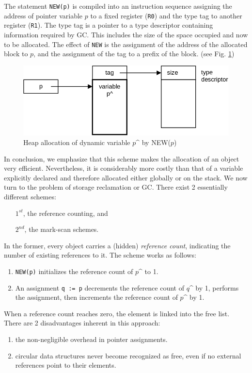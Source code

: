 The statement \verb|NEW(p)| is compiled into an instruction sequence assigning the address
of pointer variable $p$ to a fixed register (\verb|R0|) and the type tag to another register
(\verb|R1|). The type tag is a pointer to a type descriptor containing information required
by GC. This includes the size of the space occupied and now to be allocated. The effect of
\verb|NEW| is the assignment of the address of the allocated block to $p$, and the assignment
of the tag to a prefix of the block. (see Fig. \ref{fig:allocation})
\begin{figure}[h!]
  \label{fig:allocation}
  \centering
  \includegraphics[width=\textwidth]{i/r}
  \caption{Heap allocation of dynamic variable $p$\^{} by NEW($p$)}
\end{figure}

In conclusion, we emphasize that this scheme makes the allocation of an object very efficient.
Nevertheless, it is considerably more costly than that of a variable explicitly declared
and therefore allocated either globally or on the stack. We now turn to the problem of
storage reclamation or GC. There exist 2 essentially different schemes:
\begin{itemize}
  \item[$1^{st}$,] the reference counting, and
  \item[$2^{nd}$,] the mark-scan schemes.
\end{itemize}
In the former, every object carries a (hidden) \emph{reference count}, indicating the number
of existing references to it. The scheme works as follows:
\begin{enumerate}
  \item \verb|NEW(p)| initializes the reference count of $p$\^{} to 1.
  \item An assignment \verb|q := p| decrements the reference count of $q$\^{} by 1, performs
    the assignment, then increments the reference count of $p$\^{} by 1.
\end{enumerate}
When a reference count reaches zero, the element is linked into the free list. There are 2
disadvantages inherent in this approach:
\begin{enumerate}
  \item the non-negligible overhead in pointer assignments.
  \item circular data structures never become recognized as free,
    even if no external references point to their elements.
\end{enumerate}

